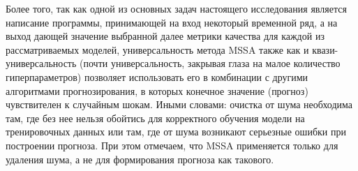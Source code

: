 Более того, так как одной из основных задач настоящего исследования является написание программы, принимающей на вход некоторый временной ряд, а на выход дающей значение выбранной далее метрики качества для каждой из рассматриваемых моделей, универсальность метода MSSA также как и квази-универсальность (почти универсальность, закрывая глаза на малое количество гиперпараметров) позволяет использовать его в комбинации с другими алгоритмами прогнозирования, в которых конечное значение (прогноз) чувствителен к случайным шокам. Иными словами: очистка от шума необходима там, где без нее нельзя обойтись для корректного обучения модели на тренировочных данных или там, где от шума возникают серьезные ошибки при построении прогноза. При этом отмечаем, что MSSA применяется только для удаления шума, а не для формирования прогноза как такового.